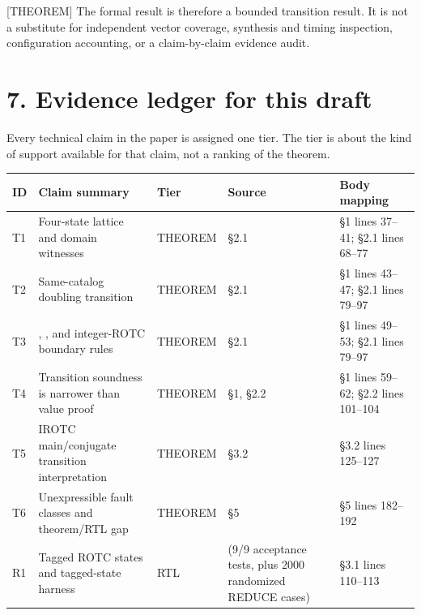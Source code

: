 \documentclass[11pt]{article}
\begin{document}
[THEOREM] The formal result is therefore a bounded transition result. It is not a substitute for independent vector coverage, synthesis and timing inspection, configuration accounting, or a claim-by-claim evidence audit.

\section{7. Evidence ledger for this draft}

Every technical claim in the paper is assigned one tier. The tier is about the kind of support available for that claim, not a ranking of the theorem.

\begin{center}

\scriptsize

\sloppy

\renewcommand{\arraystretch}{1.12}
\begin{tabularx}{\linewidth}{@{}YYYYY@{}}

\toprule

ID & Claim summary & Tier & Source & Body mapping \\

\midrule

T1 & Four-state lattice and domain witnesses & THEOREM & §2.1 & §1 lines 37–41; §2.1 lines 68–77 \\

T2 & Same-catalog doubling transition & THEOREM & §2.1 & §1 lines 43–47; §2.1 lines 79–97 \\

T3 & , , and integer-ROTC boundary rules & THEOREM & §2.1 & §1 lines 49–53; §2.1 lines 79–97 \\

T4 & Transition soundness is narrower than value proof & THEOREM & §1, §2.2 & §1 lines 59–62; §2.2 lines 101–104 \\

T5 & IROTC main/conjugate transition interpretation & THEOREM & §3.2 & §3.2 lines 125–127 \\

T6 & Unexpressible fault classes and theorem/RTL gap & THEOREM & §5 & §5 lines 182–192 \\

R1 & Tagged ROTC states and tagged-state harness & RTL &  (9/9 acceptance tests, plus 2000 randomized REDUCE cases) & §3.1 lines 110–113 \\


\end{tabularx}
\end{center}
\end{document}
